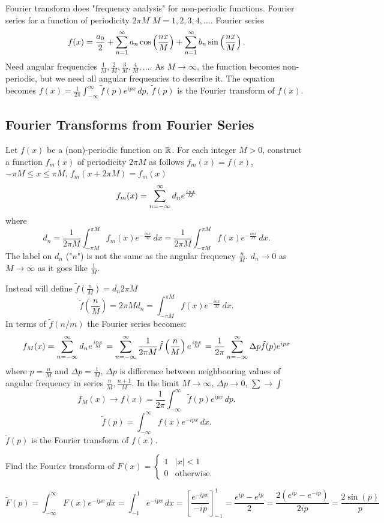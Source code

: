 \documentclass[10pt, a4paper]{article}
\begin{document}
Fourier transform does "frequency analysis" for non-periodic functions.
Fourier series for a function of periodicity $2\pi M$ $M = 1, 2, 3, 4, \dotsc$.
Fourier series
\[
f(x) = \frac{a_0}{2} + \infsum[n = 1]a_n\cos\left(\frac{nx}{M}\right) + \infsum[n = 1]b_n\sin\left(\frac{nx}{M}\right).
\]
Need angular frequencies $\frac{1}{M}, \frac{2}{M}, \frac{3}{M}, \frac{4}{M}, \dotsc$.
As $M \to \infty$,
the function becomes non-periodic,
but we need all angular frequencies to describe it.
The equation becomes $f(x) = \frac{1}{2\pi}\int_{-\infty}^{\infty}\tilde{f}(p)e ^ {ipx}\,dp$,
$\tilde{f}(p)$ is the Fourier transform of $f(x)$.

\subsection{Fourier Transforms from Fourier Series}
Let $f(x)$ be a (non)-periodic function on $\R$.
For each integer $M > 0$,
construct a function $f_m(x)$ of periodicity $2\pi M$ as follows $f_m(x) = f(x)$,
$-\pi M \leq x \leq \pi M$,
$f_m(x + 2\pi M) = f_m(x)$
\[
f_m(x) = \infsum[n = -\infty]d_ne ^ {\frac{inx}{M}}
\]
where
\[
d_n = \frac{1}{2\pi M}\int_{-\pi M}^{\pi M}f_m(x)e ^ {-\frac{inx}{M}}\,dx = \frac{1}{2\pi M}\int_{-\pi M}^{\pi M}f(x)e ^ {-\frac{inx}{M}}\,dx.
\]
The label on $d_n$
("$n$")
is not the same as the angular frequency $\frac{n}{M}$.
$d_n \to 0$ as $M \to \infty$ as it goes like $\frac{1}{M}$.

Instead will define $\tilde{f}\left(\frac{n}{M}\right) = d_n2\pi M$
\[
\tilde{f}\left(\frac{n}{M}\right) = 2\pi Md_n = \int_{-\pi M}^{\pi M}f(x)e ^ {-\frac{inx}{M}}\,dx.
\]
In terms of $\tilde{f}(n / m)$ the Fourier series becomes:
\[
f_M(x) = \infsum[n = -\infty]d_ne ^ {\frac{inx}{M}} = \infsum[n = -\infty]\frac{1}{2\pi M}\tilde{f}\left(\frac{n}{M}\right)e ^ {\frac{inx}{M}} = \frac{1}{2\pi}\infsum[n = -\infty]\Delta p\tilde{f}(p)e ^ {ipx}
\]
where $p = \frac{n}{M}$ and $\Delta p = \frac{1}{M}$,
$\Delta p$ is difference between neighbouring values of angular frequency in series $\frac{n}{M}, \frac{n + 1}{M}$.
In the limit $M \to \infty$,
$\Delta p \to 0$,
$\sum \to \int$
\[
f_M(x) \to f(x) = \frac{1}{2\pi}\int_{-\infty}^{\infty}\tilde{f}(p)e ^ {ipx}\,dp.
\]
\[
\tilde{f}(p) = \int_{-\infty}^{\infty}f(x)e ^ {-ipx}\,dx.
\]
$\tilde{f}(p)$ is the Fourier transform of $f(x)$.

\begin{example}
    Find the Fourier transform of $F(x) = \begin{cases}
        1 & |x| < 1 \\
        0 &\text{otherwise}.
    \end{cases}$

    \begin{solution}
        \[
        \tilde{F}(p) = \int_{-\infty}^{\infty}F(x)e ^ {-ipx}\,dx = \int_{-1}^{1}e ^ {-ipx}\,dx = \left[\frac{e ^ {-ipx}}{-ip}\right]_{-1}^{1} = \frac{e ^ {ip} - e ^ {ip}}{2} = \frac{2(e ^ {ip} - e ^ {-ip})}{2ip} = \frac{2\sin(p)}{p}
        \]
    \end{solution}
\end{example}
\end{document}
